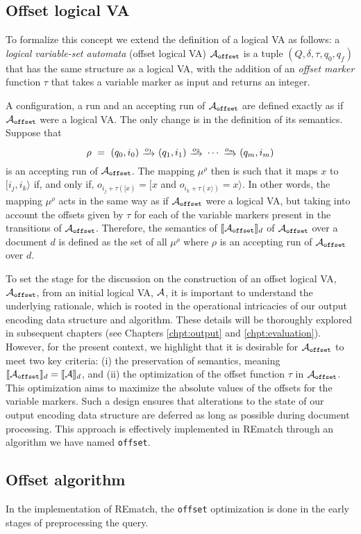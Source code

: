 \subsection{Offset logical VA} 
To formalize this concept we extend the definition of a logical VA as follows: a
\emph{logical variable-set automata} (offset logical VA) $\mathcal{A}_{\texttt{offset}}$ is a tuple
$(Q, \delta, \tau, q_0, q_f)$ that has the same structure as a logical VA, with
the addition of an \emph{offset marker} function $\tau$ that takes a variable
marker as input and returns an integer.

A configuration, a run and an accepting run of $\mathcal{A}_{\texttt{offset}}$ are defined exactly as
if $\mathcal{A}_{\texttt{offset}}$ were a logical VA. The only change is in the definition of its
semantics. Suppose that 
$$
	\rho \ = \ (q_0, i_0) \ \trans{o_1} \ (q_1, i_1) \ \trans{o_2} \ \cdots \ \trans{o_m} \ (q_m, i_m)
$$
is an accepting run of $\mathcal{A}_{\texttt{offset}}$. The mapping $\mu^\rho$ then is such that it
maps $x$ to $[i_j, i_k\rangle$ if, and only if, $o_{i_j + \tau([x)} = [x$ and
$o_{i_k + \tau(x\rangle)} = x\rangle$. In other words, the mapping $\mu^\rho$
acts in the same way as if $\mathcal{A}_{\texttt{offset}}$ were a logical VA, but taking into account
the offsets given by $\tau$ for each of the variable markers present in the
transitions of $\mathcal{A}_{\texttt{offset}}$. Therefore, the semantics of $\llbracket\mathcal{A}_{\texttt{offset}}\rrbracket_d$ of
$\mathcal{A}_{\texttt{offset}}$ over a document $d$ is defined as the set of all $\mu^\rho$ where
$\rho$ is an accepting run of $\mathcal{A}_{\texttt{offset}}$ over $d$.

To set the stage for the discussion on the construction of an offset logical VA,
$\mathcal{A}_{\texttt{offset}}$, from an initial logical VA, $\mathcal{A}$, it is important to understand the
underlying rationale, which is rooted in the operational intricacies of our
output encoding data structure and algorithm. These details will be thoroughly
explored in subsequent chapters (see Chapters \ref{chpt:output} and
\ref{chpt:evaluation}). However, for the present context, we highlight that it
is desirable for $\mathcal{A}_{\texttt{offset}}$ to meet two key criteria: (i) the preservation of
semantics, meaning $\llbracket\mathcal{A}_{\texttt{offset}}\rrbracket_d = \llbracket\mathcal{A}\rrbracket_d$, and (ii) the optimization of
the offset function $\tau$ in $\mathcal{A}_{\texttt{offset}}$. This optimization aims to maximize the
absolute values of the offsets for the variable markers. Such a design ensures
that alterations to the state of our output encoding data structure are deferred
as long as possible during document processing. This approach is effectively
implemented in REmatch through an algorithm we have named \texttt{offset}.

\subsection{Offset algorithm}
In the implementation of REmatch, the \texttt{offset} optimization is done in
the early stages of preprocessing the query.

